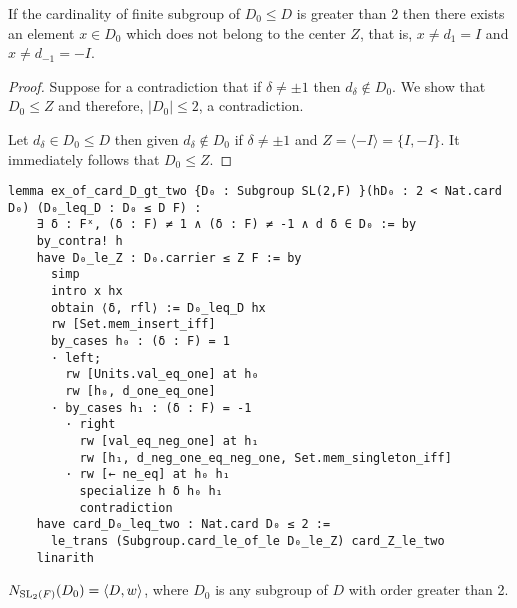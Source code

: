 \begin{lemma}
    \label{ex_of_card_D_gt_two}
    \leanok
    If the cardinality of finite subgroup of $D_0 \le D$ is greater than $2$ then there exists an element $x \in D_0$ which does not belong to the center $Z$, that is, $x \ne d_1 = I$ and $x \ne d_{-1} = -I$.
\end{lemma}
\begin{proof}
    \leanok
 Suppose for a contradiction that if $\delta \ne \pm 1$ then $d_\delta \notin D_0$. We show that $D_0 \le Z$ and therefore, $|D_0| \le 2$, a contradiction.
 
 Let $d_\delta \in D_0 \le D$ then given $d_\delta \notin D_0$ if $\delta \ne \pm 1$ and $Z = \langle -I\rangle = \{I, -I\}$. It immediately follows that $D_0 \le Z$.

\end{proof}
\begin{footnotesize}
\begin{verbatim}
lemma ex_of_card_D_gt_two {D₀ : Subgroup SL(2,F) }(hD₀ : 2 < Nat.card D₀) (D₀_leq_D : D₀ ≤ D F) :
    ∃ δ : Fˣ, (δ : F) ≠ 1 ∧ (δ : F) ≠ -1 ∧ d δ ∈ D₀ := by
    by_contra! h
    have D₀_le_Z : D₀.carrier ≤ Z F := by
      simp
      intro x hx
      obtain ⟨δ, rfl⟩ := D₀_leq_D hx
      rw [Set.mem_insert_iff]
      by_cases h₀ : (δ : F) = 1
      · left;
        rw [Units.val_eq_one] at h₀
        rw [h₀, d_one_eq_one]
      · by_cases h₁ : (δ : F) = -1
        · right
          rw [val_eq_neg_one] at h₁
          rw [h₁, d_neg_one_eq_neg_one, Set.mem_singleton_iff]
        · rw [← ne_eq] at h₀ h₁
          specialize h δ h₀ h₁
          contradiction
    have card_D₀_leq_two : Nat.card D₀ ≤ 2 :=
      le_trans (Subgroup.card_le_of_le D₀_le_Z) card_Z_le_two
    linarith
\end{verbatim}
\end{footnotesize}

\begin{proposition}
\label{normalizer_subgroup_D_eq_DW}
\leanok
    $N_{\operatorname{SL}_2(F)}(D_0) = \langle D , w \rangle$, where  $D_0$ is any subgroup of $D$ with order greater than 2. \\
    \end{proposition}

